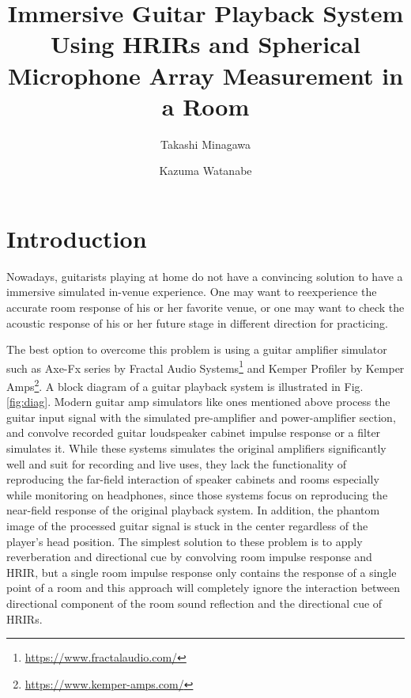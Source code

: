 \documentclass[convention,e-brief]{aesconf-current}
\title{ Immersive Guitar Playback System Using HRIRs and Spherical Microphone Array Measurement in a Room}
\author[1]{Takashi Minagawa}
\author[1]{Kazuma Watanabe}
\affil[1]{Graduate School of Design, Kyushu University}
\begin{document}

\section{Introduction}

Nowadays, guitarists playing at home do not have a convincing solution to have a immersive simulated in-venue experience.
One may want to reexperience the accurate room response of his or her favorite venue, or one may want to check the acoustic response of his or her future stage in different direction for practicing.


The best option to overcome this problem is using a guitar amplifier simulator such as Axe-Fx series by Fractal Audio Systems\footnote{\url{https://www.fractalaudio.com/}} and Kemper Profiler by Kemper Amps\footnote{\url{https://www.kemper-amps.com/}}.
A block diagram of a guitar playback system is illustrated in Fig.\ref{fig:diag}.
Modern guitar amp simulators like ones mentioned above process the guitar input signal with the simulated pre-amplifier and power-amplifier section, and convolve recorded guitar loudspeaker cabinet impulse response or a filter simulates it.
While these systems simulates the original amplifiers significantly well and suit for recording and live uses, they lack the functionality of reproducing the far-field interaction of speaker cabinets and rooms especially while monitoring on headphones, since those systems focus on reproducing the near-field response of the original playback system.
In addition, the phantom image of the processed guitar signal is stuck in the center regardless of the player's head position.
The simplest solution to these problem is to apply reverberation and directional cue by convolving room impulse response and HRIR, but a single room impulse response only contains the response of a single point of a room and this approach will completely ignore the interaction between directional component of the room sound reflection and the directional cue of HRIRs.
\end{document}
